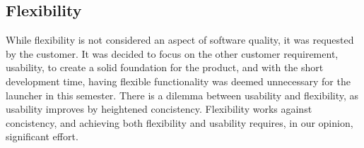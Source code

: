 \subsection*{Flexibility}
While flexibility is not considered an aspect of software quality, it was requested by the customer. 
It was decided to focus on the other customer requirement, usability, to create a solid foundation for the product, and with the short development time, having flexible functionality was deemed unnecessary for the launcher in this semester. 
There is a dilemma between usability and flexibility, as usability improves by heightened concistency.
Flexibility works against concistency, and achieving both flexibility and usability requires, in our opinion, significant effort.
